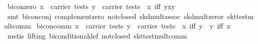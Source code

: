 \begin{isabellebody}
\ bicon{}zero{}\ {}{}x\ {}\ carrier\ tests{}\ y\ {}\ carrier\ tests{}\ {}\ {}x\ iff\ y{}{}{}{}x{}y{}\ {}\ {}{}\isanewline
%
\isadelimproof
\ \ %
\endisadelimproof
%
\isatagproof
{}\isamarkupfalse%
\ {}smt\ bicon{}conj{}\ complement{}zero\ not{}closed\ skd{}mult{}assoc\ skd{}mult{}zeror\ skt{}test{}mult{}comm{}%
\endisatagproof
{\isafoldproof}%
%
\isadelimproof
\isanewline
%
\endisadelimproof
\isanewline
{}\isamarkupfalse%
\ bicon{}comm{}\ {}{}x\ {}\ carrier\ tests{}\ y\ {}\ carrier\ tests{}\ {}\ x\ iff\ y\ {}\ y\ iff\ x{}\isanewline
%
\isadelimproof
\ \ %
\endisadelimproof
%
\isatagproof
{}\isamarkupfalse%
\ {}metis\ {}lifting{}\ biconditional{}def\ not{}closed\ skt{}test{}mult{}comm{}%

\end{isabellebody}
